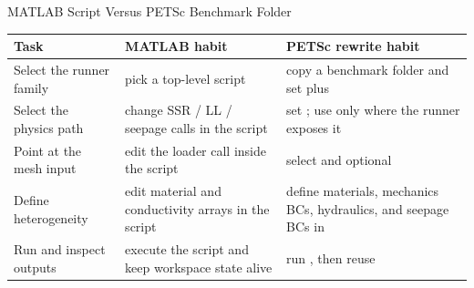 \documentclass[aspectratio=169,10pt]{beamer}
\begin{document}
\begin{frame}{MATLAB Script Versus PETSc Benchmark Folder}
\small
\begin{tabularx}{\textwidth}{p{}p{}Y}
\toprule
\textbf{Task} & \textbf{MATLAB habit} & \textbf{PETSc rewrite habit} \\
\midrule
Select the runner family & pick a top-level script & copy a benchmark folder and set  plus  \\
Select the physics path & change SSR / LL / seepage calls in the script & set ; use  only where the runner exposes it \\
Point at the mesh input & edit the loader call inside the script & select  and optional  \\
Define heterogeneity & edit material and conductivity arrays in the script & define materials, mechanics BCs, hydraulics, and seepage BCs in  \\
Run and inspect outputs & execute the script and keep workspace state alive & run , then reuse  \\
\bottomrule
\end{tabularx}
\end{frame}
\end{document}
